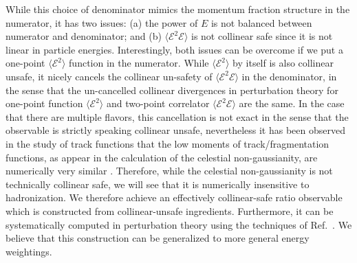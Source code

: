 \documentclass[letterpaper,11pt]{article}
\DeclareRobustCommand{\Ref}[1]{Ref.~\cite{#1}}
\begin{document}
While this choice of denominator mimics the momentum fraction structure in the numerator, it has two issues: (a) the power of $E$ is not balanced between numerator and denominator;  and (b) $\langle \mathcal{E}^2 \mathcal{E} \rangle$ is not collinear safe since it is not linear in particle energies.
%
Interestingly, both issues can be overcome if we put a one-point $\langle \mathcal{E}^2 \rangle$ function in the numerator.
%
While $\langle \mathcal{E}^2 \rangle$ by itself is also collinear unsafe, it nicely cancels the collinear un-safety of $\langle \mathcal{E}^2 \mathcal{E} \rangle$ in the denominator, in the sense that the un-cancelled collinear divergences in perturbation theory for one-point function $\langle \mathcal{E}^2 \rangle$ and two-point correlator $\langle \mathcal{E}^2 \mathcal{E} \rangle$ are the same.
%
In the case that there are multiple flavors, this cancellation is not exact in the sense that the observable is strictly speaking collinear unsafe, nevertheless it has been observed in the study of track functions that the low moments of track/fragmentation functions, as appear in the calculation of the celestial non-gaussianity, are numerically very similar \cite{Jaarsma:2022kdd}. Therefore, while the celestial non-gaussianity is not technically collinear safe, we will see that it is numerically insensitive to hadronization. We therefore achieve an effectively collinear-safe ratio observable which is constructed from collinear-unsafe ingredients. Furthermore, it can be systematically computed in perturbation theory using the techniques of \Ref{Li:2021zcf}.
%
We believe that this construction can be generalized to more general energy weightings. 
\end{document}
